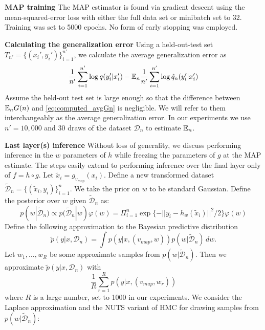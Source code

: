 \documentclass{article} %
\begin{document}

\textbf{MAP training}
The MAP estimator is found via gradient descent using the mean-squared-error loss with either the full data set or minibatch set to 32. Training was set to 5000 epochs. No form of early stopping was employed.

\textbf{Calculating the generalization error}
Using a held-out-test set $T_{n'} = \{(x_i',y_i')\}_{i=1}^{n'}$, we calculate the average generalization error as
\begin{equation}
\frac{1}{n'} \sum_{i=1}^{n'} \log q(y_i'|x_i') - {\mathbb{E}}_n \frac{1}{n'} \sum_{i=1}^{n'} \log \hat q_n(y_i'|x_i')
\label{eq:computed_avgGn}
\end{equation}
Assume the held-out test set is large enough so that the difference between ${\mathbb{E}}_n G(n)$ and \eqref{eq:computed_avgGn} is negligible. We will refer to them interchangeably as the average generalization error. In our experiments we use $n' = 10,000$ and $30$ draws of the dataset $\mathcal{D}_n$ to estimate ${\mathbb{E}}_n$.

\textbf{Last layer(s) inference}
Without loss of generality, we discuss performing inference in the $w$ parameters of $h$ while freezing the parameters of $g$ at the MAP estimate. The steps easily extend to performing inference over the final layer only of $f = h \circ g$. Let $\tilde x_i = g_{v_{map}}(x_i)$. Define a new transformed dataset $\tilde{\mathcal D}_n = \{(\tilde x_i, y_i) \}_{i=1}^n$. We take the prior on $w$ to be standard Gaussian. 
Define the posterior over $w$ given $\tilde{\mathcal D}_n$ as:
\begin{equation}
p(w | \tilde{\mathcal D}_n) \propto p(\tilde{\mathcal D}_n | w) \varphi(w) = \Pi_{i=1}^n \exp\{-|| y_i - h_w(\tilde x_i) ||^2/2\} \varphi(w)
\label{eq:last_layer_posterior}
\end{equation}
Define the following approximation to the Bayesian predictive distribution
$$
\tilde p(y|x, \mathcal D_n) = \int p(y|x,(v_{map},w)) p(w|\tilde{\mathcal D}_n) \,dw.
$$
Let $w_1,\ldots,w_R$ be some approximate samples from $p(w | \tilde{\mathcal D}_n)$. Then we approximate $\tilde p(y|x, \mathcal D_n)$ with
\[
\frac{1}{R} \sum_{r=1}^R p(y|x,(v_{map},w_r))
\]
where $R$ is a large number, set to 1000 in our experiments. We consider the Laplace approximation and the NUTS variant of HMC for drawing samples from $p(w | \tilde{\mathcal D}_n)$:
\end{document}
